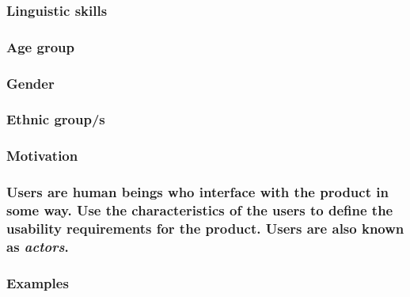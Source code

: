 \documentclass[
]{article}
\begin{document}
\hypertarget{linguistic-skills}{%
\subsubsection{Linguistic skills}\label{linguistic-skills}}

\hypertarget{age-group}{%
\subsubsection{Age group}\label{age-group}}

\hypertarget{gender}{%
\subsubsection{Gender}\label{gender}}

\hypertarget{ethnic-groups}{%
\subsubsection{Ethnic group/s}\label{ethnic-groups}}

\hypertarget{motivation-5}{%
\subsubsection{Motivation}\label{motivation-5}}

\hypertarget{users-are-human-beings-who-interface-with-the-product-in-some-way.-use-the-characteristics-of-the-users-to-define-the-usability-requirements-for-the-product.-users-are-also-known-as-actors.}{%
\subsubsection{\texorpdfstring{Users are human beings who interface with
the product in some way. Use the characteristics of the users to define
the usability requirements for the product. Users are also known as
\emph{actors}.}{Users are human beings who interface with the product in some way. Use the characteristics of the users to define the usability requirements for the product. Users are also known as actors.}}\label{users-are-human-beings-who-interface-with-the-product-in-some-way.-use-the-characteristics-of-the-users-to-define-the-usability-requirements-for-the-product.-users-are-also-known-as-actors.}}

\hypertarget{examples-1}{%
\subsubsection{Examples}\label{examples-1}}
\end{document}
